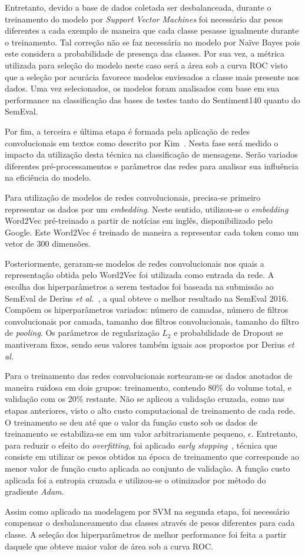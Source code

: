 Entretanto, devido a base de dados coletada ser desbalanceada, durante o treinamento do modelo por
\textit{Support Vector Machines} foi necessário dar pesos diferentes a cada exemplo de maneira que cada classe pesasse
igualmente durante o treinamento.
Tal correção não se faz necessária no modelo por Naïve Bayes pois este considera a probabilidade de presença das classes.
Por sua vez, a métrica utilizada para seleção do modelo neste caso será a área sob a curva ROC visto que a seleção por
acurácia favorece modelos enviesados a classe mais presente nos dados.
Uma vez selecionados, os modelos foram analisados com base em sua performance na classificação das bases de testes tanto
do Sentiment140 quanto do SemEval.

Por fim, a terceira e última etapa é formada pela aplicação de redes convolucionais em textos como descrito por
Kim~\cite{kim14}.
Nesta fase será medido o impacto da utilização desta técnica na classificação de mensagens.
Serão variados diferentes pré-processamentos e parâmetros das redes para analisar sua influência na eficiência do
modelo.

Para utilização de modelos de redes convolucionais, precisa-se primeiro representar os dados por um \textit{embedding}.
Neste sentido, utilizou-se o \textit{embedding} Word2Vec pré-treinado a partir de notícias em inglês, disponibilizado
pelo Google.
Este Word2Vec é treinado de maneira a representar cada token como um vetor de 300 dimensões.

Posteriormente, geraram-se modelos de redes convolucionais nos quais a representação obtida pelo Word2Vec foi utilizada
como entrada da rede.
A escolha dos hiperparâmetros a serem testados foi baseada na submissão ao SemEval de Derius
\textit{et al.}~\cite{deriu16}, a qual obteve o melhor resultado na SemEval 2016.
Compõem os hiperparâmetros variados: número de camadas, número de filtros convolucionais por camada, tamanho dos filtros
convolucionais, tamanho do filtro de \textit{pooling}.
Os parâmetros de regularização $L_{2}$ e probabilidade de Dropout se mantiveram fixos, sendo seus valores também iguais aos
propostos por Derius \textit{et al.}

Para o treinamento das redes convolucionais sortearam-se os dados anotados de maneira ruidosa em dois grupos:
treinamento, contendo 80\% do volume total, e validação com os 20\% restante.
Não se aplicou a validação cruzada, como nas etapas anteriores, visto o alto custo computacional de treinamento de cada
rede.
O treinamento se deu até que o valor da função custo sob os dados de treinamento se estabiliza-se em um valor
arbitrariamente pequeno, $\epsilon$.
Entretanto, para reduzir o efeito do \textit{overfitting}, foi aplicado \textit{early stopping}~\cite{caruana01},
técnica que consiste em utilizar os pesos obtidos na época de treinamento que corresponde ao menor valor de função custo
aplicada ao conjunto de validação.
A função custo aplicada foi a entropia cruzada e utilizou-se o otimizador por método do gradiente \textit{Adam}.

Assim como aplicado na modelagem por SVM na segunda etapa, foi necessário compensar o desbalanceamento das classes
através de pesos diferentes para cada classe.
A seleção dos hiperparâmetros de melhor performance foi feita a partir daquele que obteve maior valor de área sob a curva
ROC.
